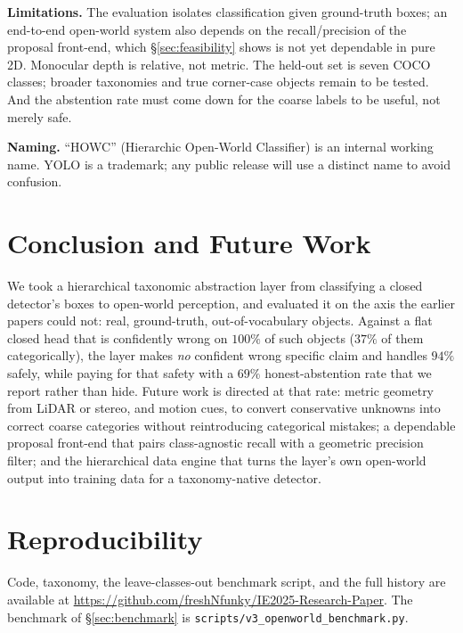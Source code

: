 \documentclass[conference]{IEEEtran}
\begin{document}
\textbf{Limitations.} The evaluation isolates classification given ground-truth
boxes; an end-to-end open-world system also depends on the recall/precision of the
proposal front-end, which \S\ref{sec:feasibility} shows is not yet dependable in
pure 2D. Monocular depth is relative, not metric. The held-out set is seven COCO
classes; broader taxonomies and true corner-case objects remain to be tested. And
the abstention rate must come down for the coarse labels to be useful, not merely
safe.

\textbf{Naming.} ``HOWC'' (Hierarchic Open-World Classifier) is an internal working
name. YOLO is a trademark; any public release will use a distinct name to avoid
confusion.

\section{Conclusion and Future Work}
We took a hierarchical taxonomic abstraction layer from classifying a closed
detector's boxes to open-world perception, and evaluated it on the axis the earlier
papers could not: real, ground-truth, out-of-vocabulary objects. Against a flat
closed head that is confidently wrong on $100\%$ of such objects ($37\%$ of them
categorically), the layer makes \emph{no} confident wrong specific claim and handles
$94\%$ safely, while paying for that safety with a $69\%$ honest-abstention rate
that we report rather than hide. Future work is directed at that rate: metric
geometry from LiDAR or stereo, and motion cues, to convert conservative unknowns
into correct coarse categories without reintroducing categorical mistakes; a
dependable proposal front-end that pairs class-agnostic recall with a geometric
precision filter; and the hierarchical data engine that turns the layer's own
open-world output into training data for a taxonomy-native detector.

\section*{Reproducibility}
Code, taxonomy, the leave-classes-out benchmark script, and the full history are
available at \url{https://github.com/freshNfunky/IE2025-Research-Paper}. The
benchmark of \S\ref{sec:benchmark} is \texttt{scripts/v3\_openworld\_benchmark.py}.



\end{document}

